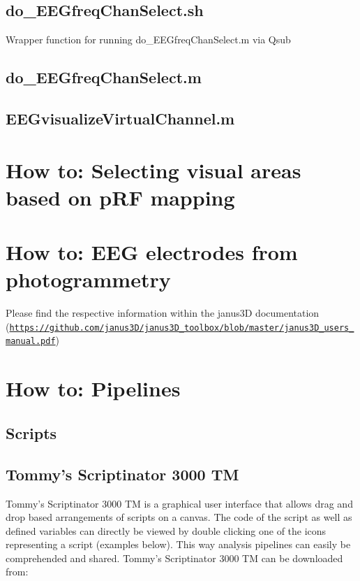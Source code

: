 \documentclass[12pt,a4paper]{scrartcl}
\begin{document}
\subsection{do\_EEGfreqChanSelect.sh}
\label{sec:selchan}
Wrapper function for running do\_EEGfreqChanSelect.m via Qsub

\subsection{do\_EEGfreqChanSelect.m}

\subsection{EEGvisualizeVirtualChannel.m}

\section{How to: Selecting visual areas based on pRF mapping}
\label{sec:GUIprf}

\section{How to: EEG electrodes from photogrammetry}
\label{sec:janus3D}
Please find the respective information within the janus3D documentation (\href{https://github.com/janus3D/janus3D_toolbox/blob/master/janus3D_users_manual.pdf}{\nolinkurl{https://github.com/janus3D/janus3D_toolbox/blob/master/janus3D_users_manual.pdf}})

\section{How to: Pipelines}
\label{sec:pipelines}
\subsection{Scripts}
\subsection{Tommy's Scriptinator 3000 TM}
\label{sec:scriptinator}
Tommy's Scriptinator 3000 TM is a graphical user interface that allows drag and drop based arrangements of scripts on a canvas. The code of the script as well as defined variables can directly be viewed by double clicking one of the icons representing a script (examples below). This way analysis pipelines can easily be comprehended and shared. Tommy's Scriptinator 3000 TM can be downloaded from:\\
\end{document}
